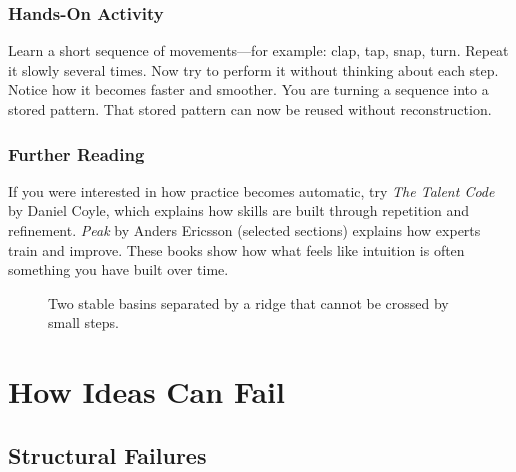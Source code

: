 \documentclass[11pt]{book}
\theoremstyle{definition}
\theoremstyle{remark}
\begin{document}
\section*{Hands-On Activity}

Learn a short sequence of movements---for example: clap, tap, snap,
turn. Repeat it slowly several times. Now try to perform it without
thinking about each step. Notice how it becomes faster and smoother.
You are turning a sequence into a stored pattern. That stored pattern
can now be reused without reconstruction.

\section*{Further Reading}

If you were interested in how practice becomes automatic, try
\textit{The Talent Code} by Daniel Coyle, which explains how skills
are built through repetition and refinement. \textit{Peak} by Anders
Ericsson (selected sections) explains how experts train and improve.
These books show how what feels like intuition is often something you
have built over time.

\begin{figure}[h]
\centering
{}
\caption{Two stable basins separated by a ridge that cannot be crossed by small steps.}
\end{figure}

\part{How Ideas Can Fail}

\chapter{Structural Failures}
\end{document}
